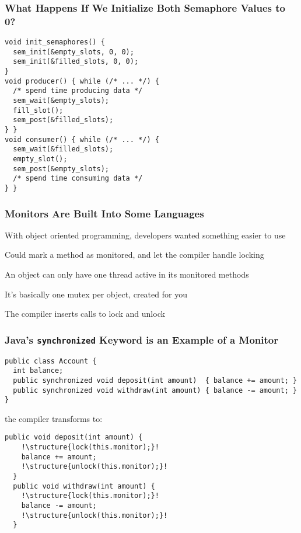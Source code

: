   \begin{frame}[fragile]
    \frametitle{What Happens If We Initialize Both Semaphore Values to 0?}

    \begin{lstlisting}
void init_semaphores() {
  sem_init(&empty_slots, 0, 0);
  sem_init(&filled_slots, 0, 0);
}
void producer() { while (/* ... */) {
  /* spend time producing data */
  sem_wait(&empty_slots);
  fill_slot();
  sem_post(&filled_slots);
} }
void consumer() { while (/* ... */) {
  sem_wait(&filled_slots);
  empty_slot();
  sem_post(&empty_slots);
  /* spend time consuming data */
} }
    \end{lstlisting}
  \end{frame}

  \begin{frame}
    \frametitle{Monitors Are Built Into Some Languages}

    With object oriented programming, developers wanted something easier to use

    \vspace{2em}

    Could mark a method as monitored, and let the compiler handle locking

    \hspace{2em} An object can only have one thread active in its monitored
    methods

    \vspace{2em}

    It's basically one mutex per object, created for you

    \hspace{2em} The compiler inserts calls to lock and unlock
  \end{frame}

  \begin{frame}[fragile]
    \frametitle{Java's \texttt{synchronized} Keyword is an Example of a Monitor}

    \begin{lstlisting}
public class Account {
  int balance;
  public synchronized void deposit(int amount)  { balance += amount; }
  public synchronized void withdraw(int amount) { balance -= amount; }
}
    \end{lstlisting}

    the compiler transforms to:

    \begin{lstlisting}[escapechar=!]
  public void deposit(int amount) {
    !\structure{lock(this.monitor);}!
    balance += amount;
    !\structure{unlock(this.monitor);}!
  }
  public void withdraw(int amount) {
    !\structure{lock(this.monitor);}!
    balance -= amount;
    !\structure{unlock(this.monitor);}!
  }
    \end{lstlisting}
  \end{frame}

